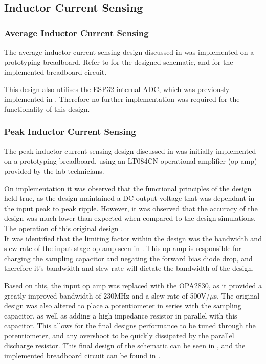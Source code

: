 \subsection{Inductor Current Sensing}

\subsubsection*{Average Inductor Current Sensing}

The average inductor current sensing design discussed in  was implemented on a prototyping breadboard. Refer to  for the designed schematic, and  for the implemented breadboard circuit.

This design also utilises the ESP32 internal ADC, which was previously implemented in . Therefore no further implementation was required for the functionality of this design.  


\subsubsection*{Peak Inductor Current Sensing}\label{S:peak_current_implementation}

The peak inductor current sensing design discussed in  was initially implemented on a prototyping breadboard, using an LT084CN operational amplifier (op amp) provided by the lab technicians. 

On implementation it was observed that the functional principles of the design held true, as the design maintained a DC output voltage that was dependant in the input peak to peak ripple. However, it was observed that the accuracy of the design was much lower than expected when compared to the design simulations. The operation of this original design  .\\

It was identified that the limiting factor within the design was the bandwidth and slew-rate of the input stage op amp seen in . This op amp is responsible for charging the sampling capacitor and negating the forward bias diode drop, and therefore it's bandwidth and slew-rate will dictate the bandwidth of the design.  

Based on this, the input op amp was replaced with the OPA2830, as it provided a greatly improved bandwidth of 230MHz and a slew rate of 500V/$\mu$s. The original design was also altered to place a potentiometer in series with the sampling capacitor, as well as adding a high impedance resistor in parallel with this capacitor. This allows for the final designs performance to be tuned through the potentiometer, and any overshoot to be quickly dissipated by the parallel discharge resistor. This final design of the schematic can be seen in , and the implemented breadboard circuit can be found in .

